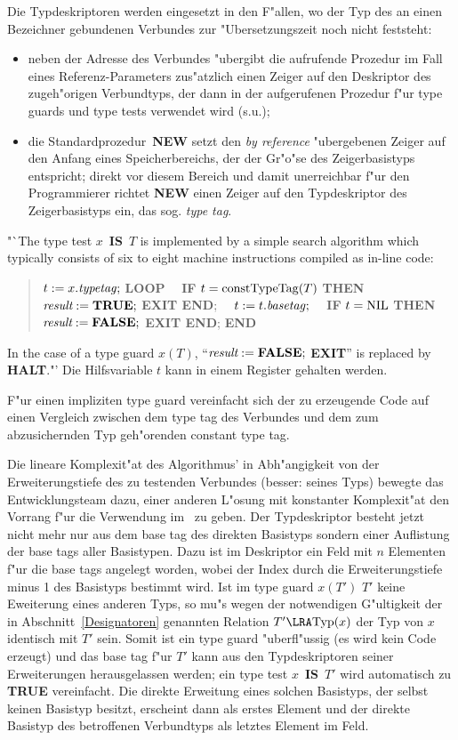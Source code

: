 Die Typdeskriptoren werden eingesetzt in den F"allen, wo der Typ des an einen
Bezeichner gebundenen Verbundes zur "Ubersetzungszeit noch nicht feststeht:
\begin{itemize}
\item neben der Adresse des Verbundes "ubergibt die aufrufende Prozedur
  im Fall eines Referenz-Parameters zus"atzlich
  einen Zeiger auf den Deskriptor des zugeh"origen Verbundtyps, der dann in
  der aufgerufenen Prozedur f"ur type guards und type tests verwendet wird (s.u.);
\item die Standardprozedur~{\bf NEW} setzt den {\it by reference\/} "ubergebenen
  Zeiger auf den Anfang eines Speicherbereichs, der der Gr"o"se des Zeigerbasistyps
  entspricht; direkt vor diesem Bereich und damit unerreichbar f"ur den Programmierer
  richtet {\bf NEW} einen Zeiger auf den Typdeskriptor des Zeigerbasistyps ein, das
  sog. {\it type tag}.
\end{itemize}

"`The type test $x$~{\bf IS}~$T$ is implemented by a simple search algorithm
which typically consists of six to eight machine instructions compiled
as in-line code:
\begin{quotation}
\obeylines
$t := x.\hbox{\it typetag\/};$
{\bf LOOP}
\ \ {\bf IF} $t=\hbox{constTypeTag\/}(T)$ {\bf THEN}  $\hbox{\it result} := \hbox{\bf TRUE};$ {\bf EXIT END};
\ \ $t := t.\hbox{\it basetag\/};$
\ \ {\bf IF} $t = \hbox{NIL}$ {\bf THEN} $\hbox{\it result} := \hbox{\bf FALSE};$ {\bf EXIT END};
{\bf END}
\end{quotation}
In the case of a type guard $x(T)$, "`$\hbox{\it result} := \hbox{\bf FALSE};$ {\bf EXIT}"'
is replaced by {\bf HALT}."'\cite[S.~872]{oberonSystem}
Die Hilfsvariable $t$ kann in einem Register gehalten werden.

F"ur einen impliziten type guard vereinfacht sich der zu erzeugende Code auf
einen Vergleich zwischen dem type tag des Verbundes und dem zum abzusichernden
Typ geh"orenden constant type tag.

Die lineare Komplexit"at des Algorithmus' in Abh"angigkeit von der
Erweiterungstiefe des zu testenden Verbundes (besser: seines Typs) bewegte
das Entwicklungsteam dazu, einer anderen L"osung mit konstanter Komplexit"at
den Vorrang f"ur die Verwendung im \OP\ zu geben.
Der Typdeskriptor besteht jetzt nicht mehr nur aus dem base tag des direkten
Basistyps sondern einer Auflistung der base tags aller Basistypen.
Dazu ist im Deskriptor ein Feld mit $n$ Elementen f"ur die base tags angelegt
worden, wobei der Index durch die Erweiterungstiefe minus 1 des Basistyps bestimmt
wird.
Ist im type guard $x(T')$ $T'$ keine Eweiterung eines anderen Typs,
so mu"s wegen der notwendigen G"ultigkeit der in Abschnitt~\ref{Designatoren}
genannten Relation $T'\LRA\hbox{Typ}(x)$ der Typ von $x$ identisch mit $T'$ sein.
Somit ist ein type guard "uberfl"ussig (es wird kein Code erzeugt) und das
base tag f"ur $T'$ kann aus den Typdeskriptoren seiner Erweiterungen herausgelassen
werden;
ein type test $x$~{\bf IS}~$T'$ wird automatisch zu {\bf TRUE} vereinfacht.
Die direkte Erweitung eines solchen Basistyps, der selbst keinen Basistyp
besitzt, erscheint dann als erstes Element und der direkte Basistyp des
betroffenen Verbundtyps als letztes Element im Feld.

